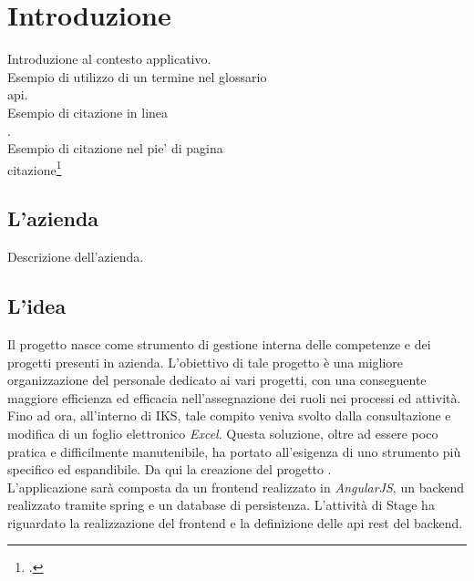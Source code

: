 
\chapter{Introduzione}
\label{cap:introduzione}

Introduzione al contesto applicativo.\\

\noindent Esempio di utilizzo di un termine nel glossario \\
\gls{api}. \\

\noindent Esempio di citazione in linea \\
\cite{site:agile-manifesto}. \\

\noindent Esempio di citazione nel pie' di pagina \\
citazione\footcite{womak:lean-thinking} \\

\section{L'azienda}

Descrizione dell'azienda.

\section{L'idea}

Il progetto \myTitle{} nasce come strumento di gestione interna delle competenze e dei progetti presenti in azienda. L'obiettivo di tale progetto è una migliore organizzazione del personale dedicato ai vari progetti, con una conseguente maggiore efficienza ed efficacia nell'assegnazione dei ruoli nei processi ed attività. Fino ad ora, all'interno di IKS, tale compito veniva svolto dalla consultazione e modifica di un foglio elettronico \emph{Excel}. Questa soluzione, oltre ad essere poco pratica e difficilmente manutenibile, ha portato all'esigenza di uno strumento più specifico ed espandibile. Da qui la creazione del progetto \myTitle{}.\\
L'applicazione sarà composta da un \gls{frontend} realizzato in \emph{AngularJS}, un \gls{backend} realizzato tramite \gls{spring} e un database di persistenza. L'attività di Stage ha riguardato la realizzazione del frontend e la definizione delle \gls{api} \gls{rest} del backend. 

